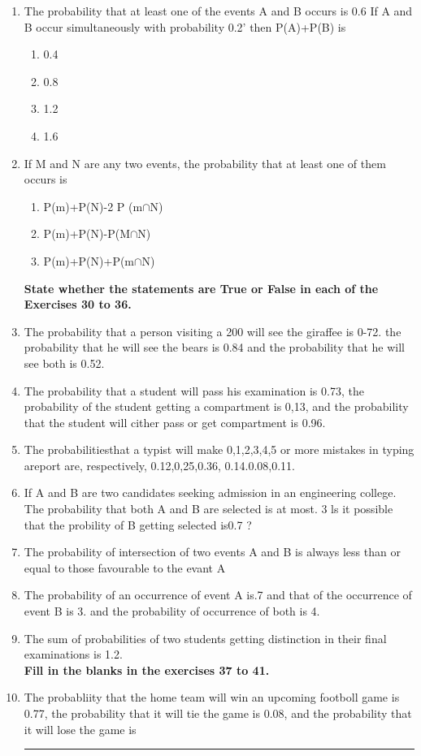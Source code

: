 \documentclass[12pt]{article}
\begin{document}
\begin{enumerate}
\item The probability that at least one of the events A and B occurs is 0.6 If A and B occur simultaneously with probability 0.2' then P(A)+P(B) is 
\begin{enumerate}
\item 0.4
\item 0.8
\item 1.2
\item 1.6
\end{enumerate}
\item If M and N are any two events, the probability that at least one of them occurs is
\begin{enumerate}
\item P(m)+P(N)-2 P (m$\cap$N)
\item P(m)+P(N)-P(M$\cap$N)
\item P(m)+P(N)+P(m$\cap$N)
\end{enumerate}
\textbf{State whether the statements are True or False in each of the Exercises 30 to 36.}
\item The probability that a person visiting a 200 will see the giraffee is 0-72. the probability that he will see the bears is 0.84 and the probability that he will see both is 0.52.
\item The probability that a student will pass his examination is 0.73, the probability of the student getting a compartment is 0,13, and the probability that the student will cither pass or get compartment is 0.96.
\item The probabilitiesthat a typist will make 0,1,2,3,4,5 or more mistakes in typing areport are, respectively, 0.12,0,25,0.36, 0.14.0.08,0.11.
\item If A and B are two candidates seeking admission in an engineering college. The probability that both A and B are selected is at most. 3 ls it possible that the probility of B getting selected is0.7 ?
\item The probability of intersection of two events A and B is always less than or equal to those favourable to the evant A
\item The probability of an occurrence of event A is.7 and that of the occurrence of event B is 3. and the probability of occurrence of both is 4.
\item The sum of probabilities of two students getting distinction in their final examinations is 1.2. 
\\
\textbf{Fill in the blanks in the exercises 37 to 41.} 
\item The probabliity that the home team will win an upcoming footboll game is 0.77, the probability that it will tie the game is 0.08, and the probability that it will lose the game is \rule{1cm}{0.15mm}    

\end{enumerate}
\end{document}

